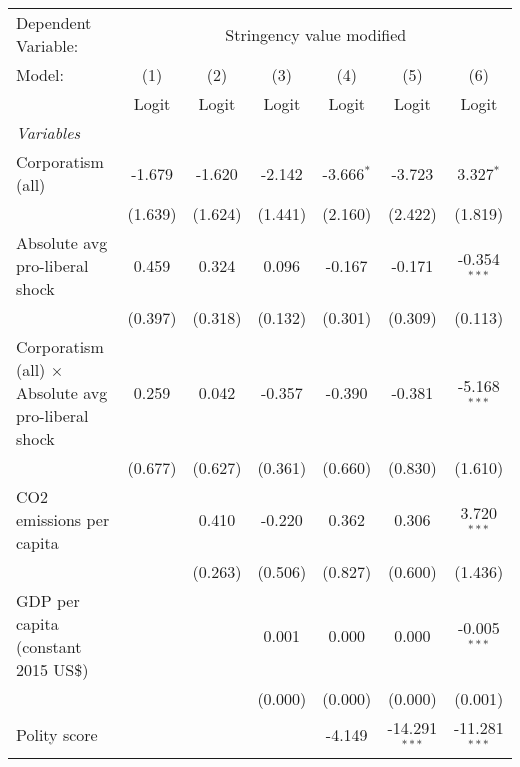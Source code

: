 
\begingroup
\centering
\begin{tabular}{lcccccc}
   \toprule
   Dependent Variable: & \multicolumn{6}{c}{Stringency value modified}\\
   Model:                                                     & (1)     & (2)     & (3)     & (4)          & (5)             & (6)\\  
                                                              &  Logit  & Logit   & Logit   & Logit        & Logit           & Logit\\  
   \midrule
   \emph{Variables}\\
   Corporatism (all)                                          & -1.679  & -1.620  & -2.142  & -3.666$^{*}$ & -3.723          & 3.327$^{*}$\\   
                                                              & (1.639) & (1.624) & (1.441) & (2.160)      & (2.422)         & (1.819)\\   
   Absolute avg pro-liberal shock                             & 0.459   & 0.324   & 0.096   & -0.167       & -0.171          & -0.354$^{***}$\\   
                                                              & (0.397) & (0.318) & (0.132) & (0.301)      & (0.309)         & (0.113)\\   
   Corporatism (all) $\times$ Absolute avg pro-liberal shock  & 0.259   & 0.042   & -0.357  & -0.390       & -0.381          & -5.168$^{***}$\\   
                                                              & (0.677) & (0.627) & (0.361) & (0.660)      & (0.830)         & (1.610)\\   
   CO2 emissions per capita                                   &         & 0.410   & -0.220  & 0.362        & 0.306           & 3.720$^{***}$\\   
                                                              &         & (0.263) & (0.506) & (0.827)      & (0.600)         & (1.436)\\   
   GDP per capita (constant 2015 US\$)                        &         &         & 0.001   & 0.000        & 0.000           & -0.005$^{***}$\\   
                                                              &         &         & (0.000) & (0.000)      & (0.000)         & (0.001)\\   
   Polity score                                               &         &         &         & -4.149       & -14.291$^{***}$ & -11.281$^{***}$\\   

\end{tabular}
